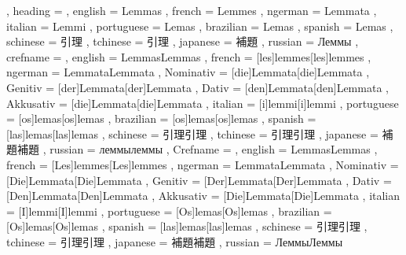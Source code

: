   {
    , heading   = {
                    , english     = Lemmas
                    , french      = Lemmes
                    , ngerman     = Lemmata
                    , italian     = Lemmi
                    , portuguese  = Lemas
                    , brazilian   = Lemas
                    , spanish     = Lemas
                    , schinese    = 引理
                    , tchinese    = 引理
                    , japanese    = 補題
                    , russian     = Леммы
                  }
    , crefname  = {
                    , english     = {Lemmas}{Lemmas}
                    , french      = [les]{lemmes}[les]{lemmes}
                    , ngerman     = { {Lemmata}{Lemmata}
                                      , Nominativ = [die]{Lemmata}[die]{Lemmata}
                                      , Genitiv   = [der]{Lemmata}[der]{Lemmata}
                                      , Dativ     = [den]{Lemmata}[den]{Lemmata}
                                      , Akkusativ = [die]{Lemmata}[die]{Lemmata}
                                    }
                    , italian     = [i]{lemmi}[i]{lemmi}
                    , portuguese  = [os]{lemas}[os]{lemas}
                    , brazilian   = [os]{lemas}[os]{lemas}
                    , spanish     = [las]{lemas}[las]{lemas}
                    , schinese    = {引理}{引理}
                    , tchinese    = {引理}{引理}
                    , japanese    = {補題}{補題}
                    , russian     = {леммы}{леммы}
                  }
    , Crefname  = {
                    , english     = {Lemmas}{Lemmas}
                    , french      = [Les]{lemmes}[Les]{lemmes}
                    , ngerman     = { {Lemmata}{Lemmata}
                                      , Nominativ = [Die]{Lemmata}[Die]{Lemmata}
                                      , Genitiv   = [Der]{Lemmata}[Der]{Lemmata}
                                      , Dativ     = [Den]{Lemmata}[Den]{Lemmata}
                                      , Akkusativ = [Die]{Lemmata}[Die]{Lemmata}
                                    }
                    , italian     = [I]{lemmi}[I]{lemmi}
                    , portuguese  = [Os]{lemas}[Os]{lemas}
                    , brazilian   = [Os]{lemas}[Os]{lemas}
                    , spanish     = [las]{lemas}[las]{lemas}
                    , schinese    = {引理}{引理}
                    , tchinese    = {引理}{引理}
                    , japanese    = {補題}{補題}
                    , russian     = {Леммы}{Леммы}
                  }
  }

